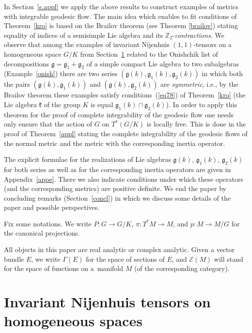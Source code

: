 \documentclass[10pt,a4paper]{amsart}
\numberwithin{equation}{section}
\begin{document}
In Section~\ref{s.appl} we apply the above results to construct examples of metrics with integrable geodesic flow. The main idea which enables to fit conditions of Theorem~\ref{kro} is based on the Brailov theorem (see Theorem \ref{brailov}) stating equality of indices of a semisimple Lie algebra and its $\mathbb{Z}_2$-\emph{contractions}. We observe that among the examples of invariant Nijenhuis $(1,1)$-tensors on a homogeneous space $G/K$ from Section~\ref{s.1} related to the Onishchik list of decompositions $\mathfrak{g}=\mathfrak{g}_1+\mathfrak{g}_2$ of a simple compact Lie algebra to two subalgebras (Example~\ref{onish}) there are two series $(\mathfrak{g}(k),\mathfrak{g}_1(k),\mathfrak{g}_2(k))$ in which both the pairs $(\mathfrak{g}(k),\mathfrak{g}_1(k))$ and $(\mathfrak{g}(k),\mathfrak{g}_2(k))$ are \emph{symmetric}, i.e., by the Brailov theorem these examples satisfy conditions~(\ref{eq78}) of Theorem~\ref{kro} (the Lie algebra $\mathfrak{k}$ of the group $K$ is equal $\mathfrak{g}_1(k)\cap\mathfrak{g}_2(k)$). In order to apply this theorem for the proof of complete integrability of the geodesic flow one needs only ensure that the action of $G$ on $T^*(G/K)$ is locally free. This is done in the proof of Theorem~\ref{appl} stating the complete integrability of the geodesic flows of the normal metric and the metric with the corresponding inertia operator.

The explicit formulae for the realizations of Lie algebras $\mathfrak{g}(k)$, $\mathfrak{g}_1(k)$, $\mathfrak{g}_2(k)$ for both series as well as for the corresponding inertia operators are given in Appendix~\ref{appe}. There we also indicate conditions under which these operators (and the corresponding metrics) are positive definite. We end the paper by concluding remarks (Section~\ref{concl}) in which we discuss some details of the paper and possible perspectives.

Fix some notations. We write $P\colon G\to G/K$, $\pi\colon T^*M\to M$, and $p\colon M\to M/G$ for the canonical projections.

All objects in this paper are real analytic or complex analytic. Given a vector bundle $E$, we write $\Gamma(E)$ for the space of sections of $E$, and $\mathcal{E}(M)$ will stand for the space of functions on a~mani\-fold $M$ (of the corresponding category).

\section{Invariant Nijenhuis tensors on homogeneous spaces}\label{s.1}
\end{document}
